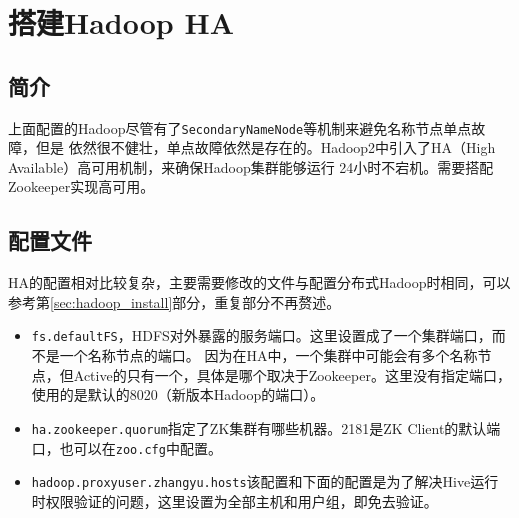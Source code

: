 \section{搭建Hadoop HA}
\subsection{简介}
上面配置的Hadoop尽管有了\lstinline{SecondaryNameNode}等机制来避免名称节点单点故障，但是
依然很不健壮，单点故障依然是存在的。Hadoop2中引入了HA（High Available）高可用机制，来确保Hadoop集群能够运行
24小时不宕机。需要搭配Zookeeper实现高可用。

\subsection{配置文件}
HA的配置相对比较复杂，主要需要修改的文件与配置分布式Hadoop时相同，可以参考第\ref{sec:hadoop_install}部分，重复部分不再赘述。

\begin{itemize}
	\item \lstinline{fs.defaultFS}，HDFS对外暴露的服务端口。这里设置成了一个集群端口，而不是一个名称节点的端口。
			因为在HA中，一个集群中可能会有多个名称节点，但Active的只有一个，具体是哪个取决于Zookeeper。这里没有指定端口，
			使用的是默认的8020（新版本Hadoop的端口）。
	\item \lstinline{ha.zookeeper.quorum}指定了ZK集群有哪些机器。2181是ZK Client的默认端口，也可以在\lstinline{zoo.cfg}中配置。
	\item \lstinline{hadoop.proxyuser.zhangyu.hosts}该配置和下面的配置是为了解决Hive运行时权限验证的问题，这里设置为全部主机和用户组，即免去验证。
\end{itemize}


